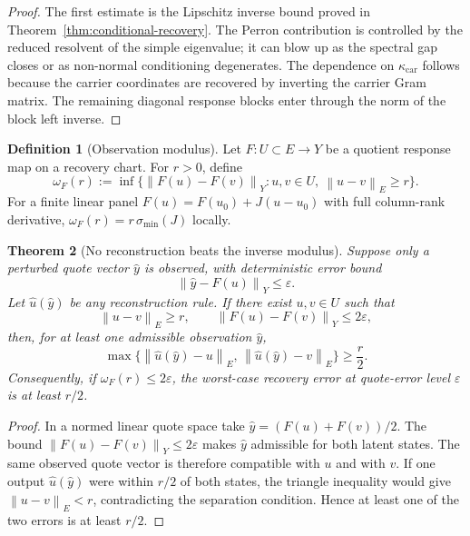 \documentclass[11pt,a4paper]{amsart}
\theoremstyle{plain}
\newtheorem{theorem}{Theorem}[section]
\theoremstyle{definition}
\newtheorem{definition}[theorem]{Definition}
\theoremstyle{remark}
\newcommand{\norm}[1]{\left\lVert #1\right\rVert}
\begin{document}
\begin{proof}
The first estimate is the Lipschitz inverse bound proved in
Theorem~\ref{thm:conditional-recovery}.  The Perron contribution is controlled by the reduced
resolvent of the simple eigenvalue; it can blow up as the spectral gap closes or as non-normal
conditioning degenerates.  The dependence on \(\kappa_{\mathrm{car}}\) follows because the carrier
coordinates are recovered by inverting the carrier Gram matrix.  The remaining diagonal response
blocks enter through the norm of the block left inverse.
\end{proof}

\begin{definition}[Observation modulus]\label{def:observation-modulus}
Let \(F:U\subset E\to Y\) be a quotient response map on a recovery chart.  For \(r>0\), define
\[
        \omega_F(r)
        :=
        \inf\{\norm{F(u)-F(v)}_Y:
        u,v\in U,\ \norm{u-v}_E\ge r\}.
\]
For a finite linear panel \(F(u)=F(u_0)+J(u-u_0)\) with full column-rank derivative,
\(\omega_F(r)=r\,\sigma_{\min}(J)\) locally.
\end{definition}

\begin{theorem}[No reconstruction beats the inverse modulus]\label{thm:inverse-modulus-lower-bound}
Suppose only a perturbed quote vector \(\widehat y\) is observed, with deterministic error bound
\[
        \norm{\widehat y-F(u)}_Y\le\varepsilon .
\]
Let \(\widehat u(\widehat y)\) be any reconstruction rule.  If there exist \(u,v\in U\) such that
\[
        \norm{u-v}_E\ge r,
        \qquad
        \norm{F(u)-F(v)}_Y\le2\varepsilon,
\]
then, for at least one admissible observation \(\widehat y\),
\[
        \max\{\norm{\widehat u(\widehat y)-u}_E,\,
        \norm{\widehat u(\widehat y)-v}_E\}
        \ge \frac r2.
\]
Consequently, if \(\omega_F(r)\le2\varepsilon\), the worst-case recovery error at quote-error
level \(\varepsilon\) is at least \(r/2\).
\end{theorem}

\begin{proof}
In a normed linear quote space take \(\widehat y=(F(u)+F(v))/2\).  The bound
\(\norm{F(u)-F(v)}_Y\le2\varepsilon\) makes \(\widehat y\) admissible for both latent states.  The
same observed quote vector is therefore compatible with \(u\) and with \(v\).  If one output
\(\widehat u(\widehat y)\) were within \(r/2\) of both states, the triangle inequality would give
\(\norm{u-v}_E<r\), contradicting the separation condition.  Hence at least one of the two errors
is at least \(r/2\).
\end{proof}
\end{document}
